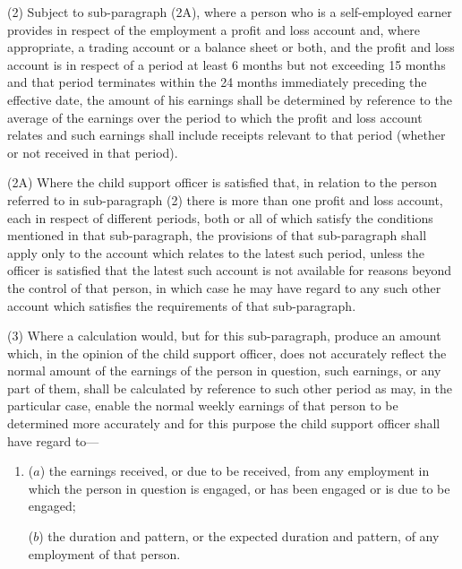 \documentclass[12pt,a4paper]{article}
\begin{document}
(2) 
Subject to sub-paragraph (2A), where  %
a person who is a self-\hspace{0pt}employed earner provides in respect of the employment a profit and loss account and, where appropriate, a trading account or a balance sheet or both, and the profit and loss account is in respect of a period at least 6 months but not exceeding 15 months and that period terminates within the 
24 months  %
immediately preceding the effective date, the amount of his earnings shall be determined by reference to the average of the earnings over the period to which the profit and loss account relates and such earnings shall include receipts relevant to that period (whether or not received in that period).

(2A) Where the child support officer is satisfied that, in relation to the person referred to in sub-paragraph (2) there is more than one profit and loss account, each in respect of different periods, both or all of which satisfy the conditions mentioned in that sub-paragraph, the provisions of that sub-paragraph shall apply only to the account which relates to the latest such period, unless the officer is satisfied that the latest such account is not available for reasons beyond the control of that person, in which case he may have regard to any such other account which satisfies the requirements of that sub-paragraph.

(3) Where a calculation would, but for this sub-paragraph, produce an amount which, in the opinion of the child support officer, does not accurately reflect the normal amount of the earnings of the person in question, such earnings, or any part of them, shall be calculated by reference to such other period as may, in the particular case, enable the normal weekly earnings of that person to be determined more accurately and for this purpose the child support officer shall have regard to—
\begin{enumerate}\item[]
($a$) the earnings received, or due to be received, from any employment in which the person in question is engaged, or has been engaged or is due to be engaged;

($b$) the duration and pattern, or the expected duration and pattern, of any employment of that person.
\end{enumerate}
\end{document}
